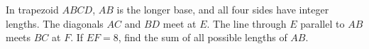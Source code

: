 In trapezoid $ABCD$, $AB$ is the longer base, and all four sides have integer lengths. The diagonals $AC$ and $BD$ meet at $E$. The line through $E$ parallel to $AB$ meets $BC$ at $F$. If $EF=8$, find the sum of all possible lengths of $AB$.
